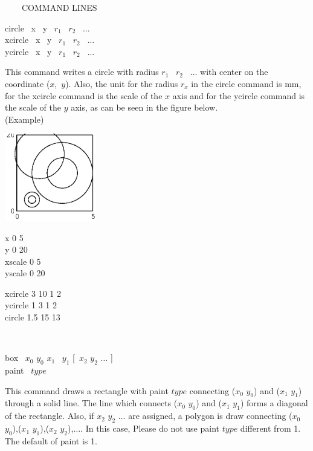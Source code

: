 \begin{qsection}{\ ~~~COMMAND LINES}
\begin{minipage}[t]{5.5cm}
circle ~x ~y ~$r_1$ ~$r_2$ ~$\dots$\\
xcircle ~x ~y ~$r_1$ ~$r_2$ ~$\dots$\\
ycircle ~x ~y ~$r_1$ ~$r_2$ ~$\dots$

\end{minipage}
\begin{minipage}[t]{9cm}
This command writes a circle with radius $r_1$ ~$r_2$ ~$\dots$
with center on the coordinate ($x$,~$y$).
Also, the unit for the radius $r_x$ in the circle command is mm,
for the xcircle command is the scale of the $x$ axis and
for the ycircle command is the scale of the $y$ axis,
as can be seen in the figure below.\\
(Example)\\
\begin{minipage}[t]{4.3cm}
 \includegraphics[width=4cm]{fig/circle.eps}
\end{minipage}
\begin{minipage}[b]{4.5cm}
\baselineskip 5pt
x 0 5\\
y 0 20\\
xscale 0 5\\
yscale 0 20

\vspace*{3mm}
xcircle 3 10 1 2\\
ycircle 1 3 1 2\\
circle  1.5 15 13\\
\vspace*{7mm}
\end{minipage}
\end{minipage}\\

\begin{minipage}[t]{5.5cm}
box ~$x_0$ $y_0$ $x_1$ ~$y_1$ [~$x_2$ $y_2$ $\dots$ ]\\
paint ~$type$
\end{minipage}
\begin{minipage}[t]{9cm}
This command draws a rectangle with paint $type$
connecting ($x_0$ $y_0$) and ($x_1$ $y_1$) through a solid line.
The line which connects ($x_0$ $y_0$) and ($x_1$ $y_1$) forms
a diagonal of the rectangle.
Also, if $x_2$ $y_2$ $\dots$ are assigned, a polygon is draw connecting
($x_0$ $y_0$),($x_1$ $y_1$),($x_2$ $y_2$),$\dots$.
In this case, Please do not use paint $type$ different from 1.
The default of paint is 1.\\


\end{minipage}
\end{qsection}
